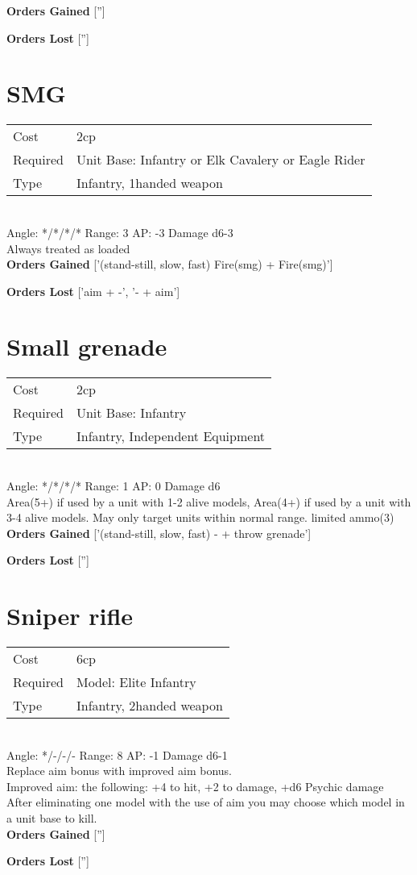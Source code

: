 {\bf Orders Gained}
['']

{\bf Orders Lost}
['']
\section{ SMG }

\begin{tabular}{ll}
    Cost & 2cp \\
    Required & Unit Base: Infantry or Elk Cavalery or Eagle Rider\\
    Type & Infantry, 1handed weapon\\
\end{tabular}
\ \\
\indent Angle: */*/*/* Range: 3  AP: -3 Damage d6-3 \\
Always treated as loaded
\ \\

{\bf Orders Gained}
['(stand-still, slow, fast) Fire(smg) + Fire(smg)']

{\bf Orders Lost}
['aim + -', '- + aim']
\section{ Small grenade }

\begin{tabular}{ll}
    Cost & 2cp \\
    Required & Unit Base: Infantry\\
    Type & Infantry, Independent Equipment\\
\end{tabular}
\ \\
\indent Angle: */*/*/* Range: 1  AP: 0 Damage d6 \\
Area(5+) if used by a unit with 1-2 alive models, Area(4+) if used by a unit with 3-4 alive models. May only target units within normal range. limited ammo(3)
\ \\

{\bf Orders Gained}
['(stand-still, slow, fast) - + throw grenade']

{\bf Orders Lost}
['']
\section{ Sniper rifle }

\begin{tabular}{ll}
    Cost & 6cp \\
    Required & Model: Elite Infantry\\
    Type & Infantry, 2handed weapon\\
\end{tabular}
\ \\
\indent Angle: */-/-/- Range: 8  AP: -1 Damage d6-1 \\
Replace aim bonus with improved aim bonus. \\ Improved aim: the following: +4 to hit, +2 to damage, +d6 Psychic damage\\ After eliminating one model with the use of aim you may choose which model in a unit base to kill.
\ \\

{\bf Orders Gained}
['']

{\bf Orders Lost}
['']
